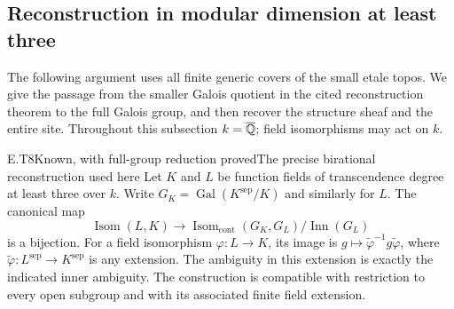 \subsection{Reconstruction in modular dimension at least three}

The following argument uses all finite generic covers of the small
etale topos.  We give the passage from the smaller Galois quotient
in the cited reconstruction theorem to the full Galois group, and
then recover the structure sheaf and the entire site.  Throughout
this subsection $k=\overline{\mathbb Q}$; field isomorphisms may act on $k$.

\begin{result}{E.T8}{Known, with full-group reduction proved}{The precise birational reconstruction used here}
Let $K$ and $L$ be function fields of transcendence degree at least
three over $k$.  Write $G_K=\operatorname{Gal}(K^{\mathrm{sep}}/K)$
and similarly for $L$.  The canonical map
\[
 \operatorname{Isom}(L,K)\longrightarrow
 \operatorname{Isom}_{\mathrm{cont}}(G_K,G_L)/\operatorname{Inn}(G_L)
                                                               \tag{E.T19}
\]
is a bijection.  For a field isomorphism $\varphi:L\to K$, its image
is $g\mapsto\widetilde\varphi^{-1}g\widetilde\varphi$, where
$\widetilde\varphi:L^{\mathrm{sep}}\to K^{\mathrm{sep}}$ is any
extension.  The ambiguity in this extension is exactly the indicated
inner ambiguity.  The construction is compatible with restriction
to every open subgroup and with its associated finite field extension.
\end{result}
